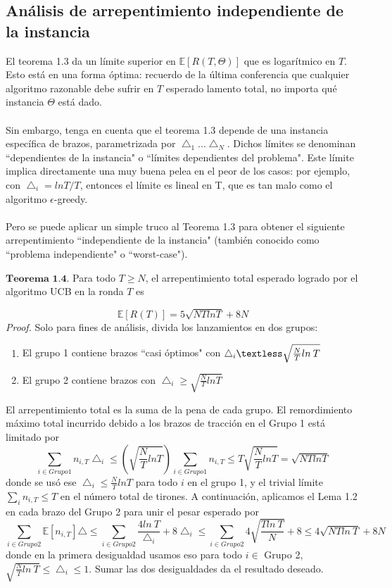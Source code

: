 \documentclass{article}
\begin{document}
\subsection{Análisis de arrepentimiento independiente de la instancia}

El teorema 1.3 da un límite superior en $\mathds{E}[R(T, \Theta)]$ que es logarítmico en $T$. Esto está en una forma
óptima: recuerdo de la última conferencia que
cualquier algoritmo razonable debe sufrir en $T$
esperado lamento total, no importa qué instancia $\Theta$
está dado. \\\\Sin embargo, tenga en cuenta que el
teorema 1.3 depende de una instancia específica de
brazos, parametrizada por $\bigtriangleup_1. . . \bigtriangleup_N$. Dichos
límites se denominan ``dependientes de la instancia"
o ``límites dependientes del problema". Este límite
implica directamente una muy buena pelea en el peor
de los casos: por ejemplo, con $\bigtriangleup_i = ln T / T$,
entonces el límite es lineal en T, que es tan malo
como el algoritmo $\epsilon$-greedy.\\\\ 
Pero se puede aplicar un simple truco al Teorema 1.3 para obtener el siguiente arrepentimiento ``independiente de la instancia" (también conocido como ``problema independiente" o ``worst-case").

$\textbf{Teorema 1.4.}$ Para todo $T \geq N$, el arrepentimiento total esperado logrado por el algoritmo UCB en la ronda $T$ es

\[
\mathds{E}[R(T)]=5\sqrt{NTlnT} + 8N
\]
\textit{Proof.} Solo para fines de análisis, divida los lanzamientos en dos grupos:
\begin{enumerate}
    \item El grupo 1 contiene brazos ``casi
    óptimos" con $\bigtriangleup_i \textless
    \sqrt{\frac{N}{T}ln \>T}$
    
    \item El grupo 2 contiene brazos con
    $\bigtriangleup_i \geq \sqrt{\frac{N}{T}lnT}$
    
\end{enumerate}
El arrepentimiento total es la suma de la pena de cada grupo. El remordimiento máximo total incurrido debido a los brazos de tracción en el Grupo 1 está limitado por
\[
\sum_{i \in Grupo 1} n_{i, T}\bigtriangleup_i \leq
\left( \sqrt{\frac{N}{T}lnT}\right) \sum_{i \in Grupo 1} n_{i, T} \leq T \sqrt{\frac{N}{T}lnT}=\sqrt{NTlnT}
\]
donde se usó ese $\bigtriangleup_i \leq \frac{N}{T}lnT$ para todo $i$ en el grupo 1, y el trivial límite $\sum_{i}n_{i, T} \leq T$ en el número total de tirones. A continuación, aplicamos el Lema 1.2 en cada brazo del Grupo 2 para unir el pesar esperado por
\[
\sum_{i \in Grupo 2} \mathds{E}[n_{i, T}]\bigtriangleup \leq \sum_{i \in Grupo 2} \frac{4ln\>T}{\bigtriangleup_i} +8\bigtriangleup_i \leq \sum_{i \in Grupo 2} 4\sqrt{\frac{Tln\>T}{N}}+8 \leq 4\sqrt{NTln\>T}+8N
\]
donde en la primera desigualdad usamos eso para
todo $i \in$ Grupo 2, $\sqrt{\frac{N}{T}ln\>T}\leq
\bigtriangleup_i \leq 1$. Sumar las dos
desigualdades da el resultado deseado.
\end{document}
